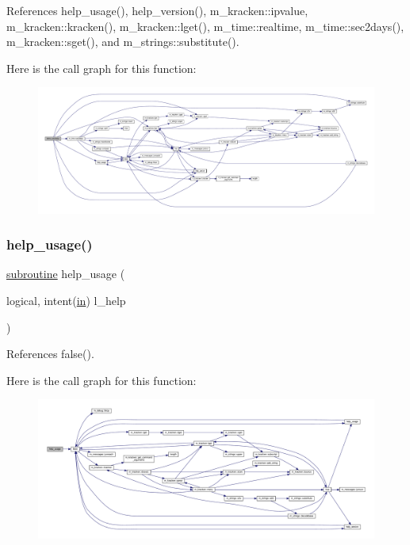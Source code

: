 References help\+\_\+usage(), help\+\_\+version(), m\+\_\+kracken\+::ipvalue, m\+\_\+kracken\+::kracken(), m\+\_\+kracken\+::lget(), m\+\_\+time\+::realtime, m\+\_\+time\+::sec2days(), m\+\_\+kracken\+::sget(), and m\+\_\+strings\+::substitute().

Here is the call graph for this function\+:
\nopagebreak
\begin{figure}[H]
\begin{center}
\leavevmode
\includegraphics[width=350pt]{sec2days_8f90_a85f052202d8a5417c74334a5fd499e2d_cgraph}
\end{center}
\end{figure}
\mbox{\label{sec2days_8f90_a3e09a3b52ee8fb04eeb93fe5761626a8}} 
\subsubsection{\texorpdfstring{help\+\_\+usage()}{help\_usage()}}
{\footnotesize\ttfamily \hyperlink{M__stopwatch_83_8txt_acfbcff50169d691ff02d4a123ed70482}{subroutine} help\+\_\+usage (\begin{DoxyParamCaption}\item[{logical, intent(\hyperlink{M__journal_83_8txt_afce72651d1eed785a2132bee863b2f38}{in})}]{l\+\_\+help }\end{DoxyParamCaption})}



References false().

Here is the call graph for this function\+:
\nopagebreak
\begin{figure}[H]
\begin{center}
\leavevmode
\includegraphics[width=350pt]{sec2days_8f90_a3e09a3b52ee8fb04eeb93fe5761626a8_cgraph}
\end{center}
\end{figure}
\mbox{\label{sec2days_8f90_a39c21619b08a3c22f19e2306efd7f766}} 
